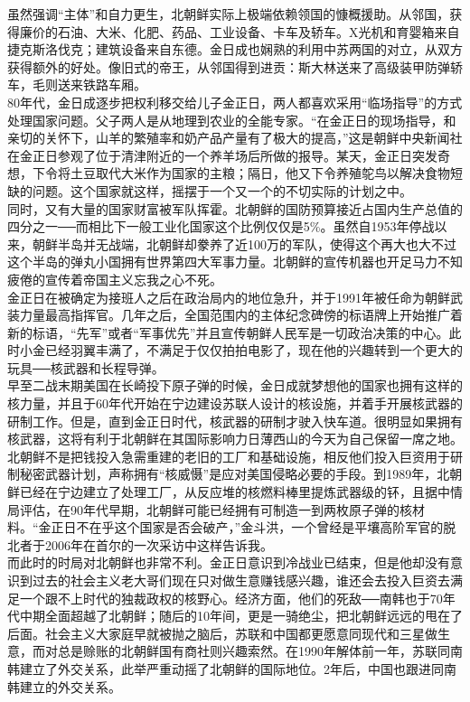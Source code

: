 虽然强调“主体”和自力更生，北朝鲜实际上极端依赖领国的慷概援助。从邻国，获得廉价的石油、大米、化肥、药品、工业设备、卡车及轿车。X光机和育婴箱来自捷克斯洛伐克；建筑设备来自东德。金日成也娴熟的利用中苏两国的对立，从双方获得额外的好处。像旧式的帝王，从邻国得到进贡：斯大林送来了高级装甲防弹轿车，毛则送来铁路车厢。\\

80年代，金日成逐步把权利移交给儿子金正日，两人都喜欢采用“临场指导”的方式处理国家问题。父子两人是从地理到农业的全能专家。“在金正日的现场指导，和亲切的关怀下，山羊的繁殖率和奶产品产量有了极大的提高，”这是朝鲜中央新闻社在金正日参观了位于清津附近的一个养羊场后所做的报导。某天，金正日突发奇想，下令将土豆取代大米作为国家的主粮；隔日，他又下令养殖鸵鸟以解决食物短缺的问题。这个国家就这样，摇摆于一个又一个的不切实际的计划之中。\\

同时，又有大量的国家财富被军队挥霍。北朝鲜的国防预算接近占国内生产总值的四分之一──而相比下一般工业化国家这个比例仅仅是5\%。虽然自1953年停战以来，朝鲜半岛并无战端，北朝鲜却豢养了近100万的军队，使得这个再大也大不过这个半岛的弹丸小国拥有世界第四大军事力量。北朝鲜的宣传机器也开足马力不知疲倦的宣传着帝国主义忘我之心不死。\\

金正日在被确定为接班人之后在政治局内的地位急升，并于1991年被任命为朝鲜武装力量最高指挥官。几年之后，全国范围内的主体纪念碑傍的标语牌上开始推广着新的标语，“先军”或者“军事优先”并且宣传朝鲜人民军是一切政治决策的中心。此时小金已经羽翼丰满了，不满足于仅仅拍拍电影了，现在他的兴趣转到一个更大的玩具──核武器和长程导弹。\\

早至二战末期美国在长崎投下原子弹的时候，金日成就梦想他的国家也拥有这样的核力量，并且于60年代开始在宁边建设苏联人设计的核设施，并着手开展核武器的研制工作。但是，直到金正日时代，核武器的研制才驶入快车道。很明显如果拥有核武器，这将有利于北朝鲜在其国际影响力日薄西山的今天为自己保留一席之地。北朝鲜不是把钱投入急需重建的老旧的工厂和基础设施，相反他们投入巨资用于研制秘密武器计划，声称拥有“核威慑”是应对美国侵略必要的手段。到1989年，北朝鲜已经在宁边建立了处理工厂，从反应堆的核燃料棒里提炼武器级的钚，且据中情局评估，在90年代早期，北朝鲜可能已经拥有可制造一到两枚原子弹的核材料。“金正日不在乎这个国家是否会破产，”金斗洪，一个曾经是平壤高阶军官的脱北者于2006年在首尔的一次采访中这样告诉我。\\

而此时的时局对北朝鲜也非常不利。金正日意识到冷战业已结束，但是他却没有意识到过去的社会主义老大哥们现在只对做生意赚钱感兴趣，谁还会去投入巨资去满足一个跟不上时代的独裁政权的核野心。经济方面，他们的死敌──南韩也于70年代中期全面超越了北朝鲜；随后的10年间，更是一骑绝尘，把北朝鲜远远的甩在了后面。社会主义大家庭早就被抛之脑后，苏联和中国都更愿意同现代和三星做生意，而对总是赊账的北朝鲜国有商社则兴趣索然。在1990年解体前一年，苏联同南韩建立了外交关系，此举严重动摇了北朝鲜的国际地位。2年后，中国也跟进同南韩建立的外交关系。\\

